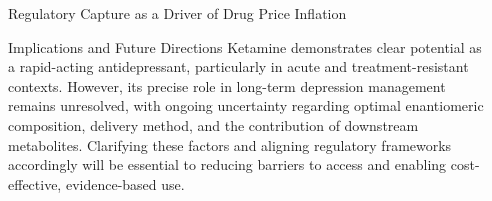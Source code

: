 \documentclass[final]{beamer}
\newlength{\sepwidth}
\newlength{\colwidth}
\newcommand{\separatorcolumn}{\begin{column}{\sepwidth}\end{column}}
\begin{document}
\begin{frame}[t]
\begin{columns}[t]
{\begin{column}{\colwidth}
\begin{block}{Regulatory Capture as a Driver of Drug Price Inflation}
    \end{block}
    
    \begin{block}{Implications and Future Directions}
      Ketamine demonstrates clear potential as a rapid-acting antidepressant, 
      particularly in acute and treatment-resistant contexts. However, its precise 
      role in long-term depression management remains unresolved, with ongoing uncertainty 
      regarding optimal enantiomeric composition, delivery method, and the contribution of 
      downstream metabolites. Clarifying these factors and aligning regulatory frameworks 
      accordingly will be essential to reducing barriers to access and enabling cost-effective, 
      evidence-based use.

      \footnotesize
      \vspace*{100cm}
      
    \end{block}
    
    
\end{column}
}
\separatorcolumn%
\end{columns}
\end{frame}
\end{document}
